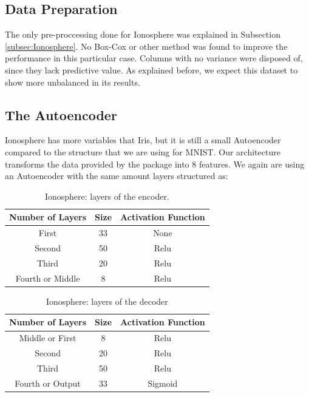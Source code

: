 \subsection{Data Preparation}

The only pre-proccessing done for Ionosphere was explained in Subsection \ref{subsec:Ionosphere}. No Box-Cox or other method was found to improve the performance in this particular case. Columns with no variance were disposed of, since they lack predictive value.
As explained before, we expect this dataset to show more unbalanced in its results.

\subsection{The Autoencoder}

Ionosphere has more variables that Iris, but it is still a small Autoencoder compared to the structure that we are using for MNIST. Our architecture transforms the data provided by the package into $8$ features. We again are using an Autoencoder with the same amount layers structured as:  
%
\begin{table}[H]
	\caption{Ionosphere: layers of the encoder.}
	\label{tab:table_Ionosphere_auto_encoder}
	\begin{center}
		\begin{tabular}{c|c|c} %
			\textbf{Number of Layers} & \textbf{Size} & \textbf{Activation Function} \\
			\hline
			First & 33 & None\\
			Second & 50 & Relu\\
			Third & 20 & Relu\\
			Fourth or Middle & 8 & Relu\\
		\end{tabular}
	\end{center}
\end{table}

\begin{table}[H]
	\caption{Ionosphere:  layers of the decoder}
	\label{tab:table_Ionosphere_auto_decoder}
	\begin{center}
		\begin{tabular}{c|c|c} %
			\textbf{Number of Layers} & \textbf{Size} & \textbf{Activation Function} \\
			\hline
			Middle or First & 8 & Relu\\
			Second & 20 & Relu\\
			Third & 50 & Relu\\
			Fourth or Output & 33 & Sigmoid\\
		\end{tabular}
	\end{center}
\end{table}

